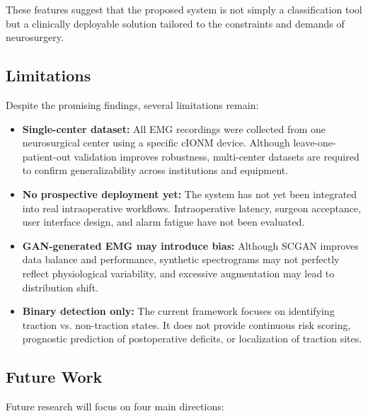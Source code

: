 \documentclass[10pt]{article}
\begin{document}
These features suggest that the proposed system is not simply a classification tool but a clinically deployable solution tailored to the constraints and demands of neurosurgery.

\subsection{Limitations}

Despite the promising findings, several limitations remain:

\begin{itemize}
    \item \textbf{Single-center dataset:} All EMG recordings were collected from one neurosurgical center using a specific cIONM device. Although leave-one-patient-out validation improves robustness, multi-center datasets are required to confirm generalizability across institutions and equipment.
    \item \textbf{No prospective deployment yet:} The system has not yet been integrated into real intraoperative workflows. Intraoperative latency, surgeon acceptance, user interface design, and alarm fatigue have not been evaluated.
    \item \textbf{GAN-generated EMG may introduce bias:} Although SCGAN improves data balance and performance, synthetic spectrograms may not perfectly reflect physiological variability, and excessive augmentation may lead to distribution shift.
    \item \textbf{Binary detection only:} The current framework focuses on identifying traction vs. non-traction states. It does not provide continuous risk scoring, prognostic prediction of postoperative deficits, or localization of traction sites.
\end{itemize}

\subsection{Future Work}

Future research will focus on four main directions:
\end{document}
